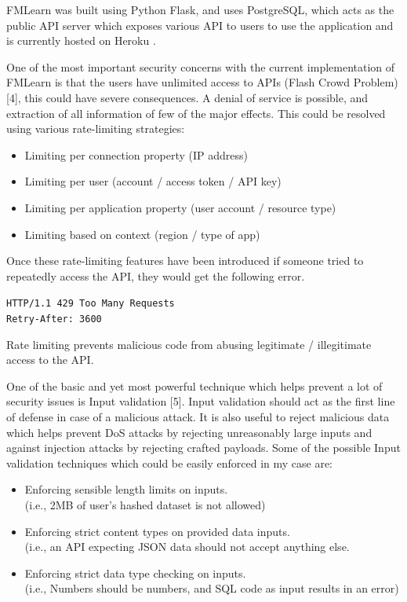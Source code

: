 FMLearn was built using Python Flask, and uses PostgreSQL, which acts as the public API server which exposes various API to users to use the application and is currently hosted on Heroku .

One of the most important security concerns with the current implementation of FMLearn is that the users have unlimited access to APIs (Flash Crowd Problem) [4], this could have severe consequences. A denial of service is possible, and extraction of all information of few of the major effects. This could be resolved using various rate-limiting strategies:

\begin{itemize} 
    \item Limiting per connection property (IP address)
    \item Limiting per user (account / access token / API key)
    \item Limiting per application property (user account / resource type)
    \item Limiting based on context (region / type of app)
\end{itemize}

Once these rate-limiting features have been introduced if someone tried to repeatedly access the API, they would get the following error.

\quad\quad\quad\quad\quad\quad\quad\quad\quad\quad\quad\quad\quad
\texttt{HTTP/1.1 429 Too Many Requests}\\
\quad\quad\quad\quad\quad\quad\quad\quad\quad\quad\quad\quad\quad
\texttt{Retry-After: 3600}


Rate limiting prevents malicious code from abusing legitimate / illegitimate access to the API.

One of the basic and yet most powerful technique which helps prevent a lot of security issues is Input validation [5]. Input validation should act as the first line of defense in case of a malicious attack. It is also useful to reject malicious data which helps prevent DoS attacks by rejecting unreasonably large inputs and against injection attacks by rejecting crafted payloads. Some of the possible Input validation techniques which could be easily enforced in my case are:

\begin{itemize}
    \item Enforcing sensible length limits on inputs.\\
    (i.e., 2MB of user’s hashed dataset is not allowed)
    \item Enforcing strict content types on provided data inputs.\\
    (i.e., an API expecting JSON data should not accept anything else.
    \item Enforcing strict data type checking on inputs.\\
    (i.e., Numbers should be numbers, and SQL code as input results in an error)
\end{itemize}

